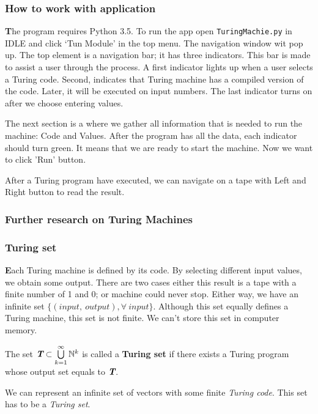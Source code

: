 \documentclass{beamer}
\def\mathbi#1{\textbf{\em #1}}
\begin{document}

\begin{frame}
\frametitle{How to work with application}
\textbf{\large T}he program requires Python 3.5. To run the app open \texttt{TuringMachie.py} in IDLE and click `Tun Module' in the top menu. The navigation window wit pop up. The top element is a navigation bar; it has three indicators. This bar is made to assist a user through the process. A first indicator lights up when a user selects a Turing code. Second, indicates that Turing machine has a compiled version of the code. Later, it will be executed on input numbers. The last indicator turns on after we choose entering values.

The next section is a where we gather all information that is needed to run the machine: Code and Values. After the program has all the data, each indicator should turn green. It means that we are ready to start the machine. Now we want to click 'Run' button.

After a Turing program have executed, we can navigate on a tape with Left and Right button to read the result.
\end{frame}

{%
\begin{frame}[plain]
\end{frame}
}%

\begin{frame}
\frametitle{Further research on Turing Machines}
\end{frame}

\begin{frame}
\frametitle{Turing set}
\textbf{\large E}ach Turing machine is defined by its code. By selecting different input values, we obtain some output. There are two cases either this result is a tape with a finite number of 1 and 0; or machine could never stop. Either way, we have an infinite set $\{(input,\ output), \forall\ input\}$. Although this set equally defines a Turing machine, this set is not finite. We can't store this set in computer memory.

\begin{definition}
The set $\mathbi{T}\subset\bigcup\limits_{k=1}^{\infty}\mathbb{N}^k$ is called a \textbf{Turing set} if there exists a Turing program whose output set equals to $\mathbi{T}$.
\end{definition}

We can represent an infinite set of vectors with some finite \emph{Turing code}. This set has to be a \emph{Turing set}.
\end{frame}
\end{document}
